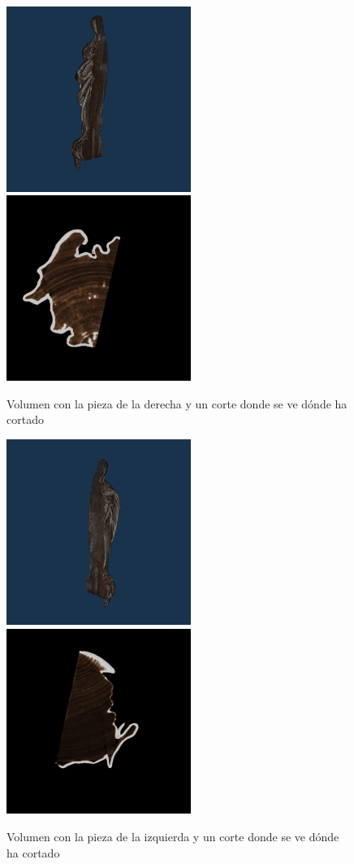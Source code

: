 \begin{figure}[H]
	\centering
	\includegraphics[width=6cm]{imagenes/resultados/segmentacion/inmaculada-concepcion/dcha-3d}
	\includegraphics[width=6cm]{imagenes/resultados/segmentacion/inmaculada-concepcion/dcha-corte}
	\caption{Volumen con la pieza de la derecha y un corte donde se ve dónde ha cortado}
	\label{fig:resultados/segmentacion/inmaculada-concepcion/dcha}
\end{figure}

\begin{figure}[H]
	\centering
	\includegraphics[width=6cm]{imagenes/resultados/segmentacion/inmaculada-concepcion/izda-3d}
	\includegraphics[width=6cm]{imagenes/resultados/segmentacion/inmaculada-concepcion/izda-corte}
	\caption{Volumen con la pieza de la izquierda y un corte donde se ve dónde ha cortado}
	\label{fig:resultados/segmentacion/inmaculada-concepcion/izda}
\end{figure}

